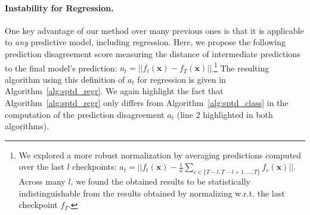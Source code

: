 
\paragraph{Instability for Regression.} One key advantage of our method over many previous ones is that it is applicable to \emph{any} predictive model, including regression. %
Here, we propose the following prediction disagreement score measuring the distance of intermediate predictions to the final model's prediction: $a_t = ||f_t (\bm{x}) - f_T (\bm{x})||$.\footnote{We explored a more robust normalization by averaging predictions computed over the last $l$ checkpoints: $a_t = ||f_t (\bm{x}) - \frac{1}{n}\sum_{c \in \{T-l, T-l+1, \ldots, T \}} f_c (\bm{x})||$. Across many $l$, we found the obtained results to be statistically indistinguishable from the results obtained by normalizing w.r.t. the last checkpoint $f_T$.} 
The resulting algorithm using this definition of $a_t$ for regression is given in Algorithm~\ref{alg:sptd_regr}. We again highlight the fact that Algorithm~\ref{alg:sptd_regr} only differs from Algorithm~\ref{alg:sptd_class} in the computation of the prediction disagreement $a_t$ (line 2 highlighted in both algorithms).

